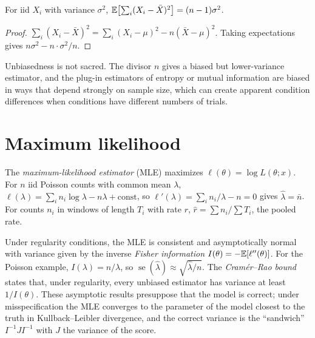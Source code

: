 \begin{proposition}
For iid $X_i$ with variance $\sigma^2$, $\mathbb E\bigl[\sum_i(X_i-\bar X)^2\bigr]=(n-1)\sigma^2$.
\end{proposition}
\begin{proof}
$\sum_i(X_i-\bar X)^2=\sum_i(X_i-\mu)^2-n(\bar X-\mu)^2$. Taking expectations gives $n\sigma^2-n\cdot\sigma^2/n$.
\end{proof}
Unbiasedness is not sacred. The divisor $n$ gives a biased but lower-variance estimator, and the plug-in estimators of entropy or mutual information are biased in ways that depend strongly on sample size, which can create apparent condition differences when conditions have different numbers of trials.

\section{Maximum likelihood}
The \emph{maximum-likelihood estimator} (MLE) maximizes $\ell(\theta)=\log L(\theta;x)$. For $n$ iid Poisson counts with common mean $\lambda$, $\ell(\lambda)=\sum_in_i\log\lambda-n\lambda+\text{const}$, so $\ell'(\lambda)=\sum_in_i/\lambda-n=0$ gives $\hat\lambda=\bar n$. For counts $n_i$ in windows of length $T_i$ with rate $r$, $\hat r=\sum n_i/\sum T_i$, the pooled rate.

Under regularity conditions, the MLE is consistent and asymptotically normal with variance given by the inverse \emph{Fisher information} $I(\theta)=-\mathbb E[\ell''(\theta)]$. For the Poisson example, $I(\lambda)=n/\lambda$, so $\operatorname{se}(\hat\lambda)\approx\sqrt{\hat\lambda/n}$. The \emph{Cram\'er--Rao bound} states that, under regularity, every unbiased estimator has variance at least $1/I(\theta)$. These asymptotic results presuppose that the model is correct; under misspecification the MLE converges to the parameter of the model closest to the truth in Kullback--Leibler divergence, and the correct variance is the ``sandwich'' $I^{-1}JI^{-1}$ with $J$ the variance of the score.

